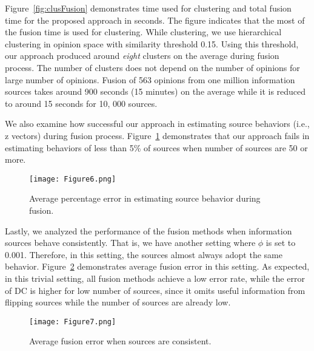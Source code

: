 \documentclass[a4,12pt]{ozu-thesis}
\begin{document}
Figure~\ref{fig:clusFusion} demonstrates time used for clustering and total fusion time for the proposed approach in seconds. The figure indicates that the most of the fusion time is used for clustering. While clustering, we use hierarchical clustering in opinion space with similarity threshold 0.15. Using this threshold, our approach produced around \textit{eight} clusters on the average during fusion process. The number of clusters does not depend on the number of opinions for large number of opinions. Fusion of 563 opinions from one million information sources takes around 900 seconds (15 minutes) on the average while it is reduced to around 15 seconds for 10, 000 sources.

We also examine how successful our approach in estimating source behaviors (i.e., z vectors) during fusion process.
Figure~\ref{fig:avegErrDuringFusion} demonstrates that our approach fails in estimating behaviors of less than 5\% of sources when number of sources are 50 or more.

\begin{figure}[h]
\begin{center}
\texttt{[image: Figure6.png]}
\end{center}
\caption{Average percentage error in estimating source behavior during fusion.}
\label{fig:avegErrDuringFusion}
\end{figure}

Lastly, we analyzed the performance of the fusion methods when information sources behave consistently. That is, we have another setting where $\phi$ is set to 0.001. Therefore, in this setting, the sources almost always adopt the same behavior. Figure~\ref{fig:avegErrConsistent} demonstrates average fusion error in this setting. As expected, in this trivial setting, all fusion methods achieve a low error rate, while the error of DC is higher for low number of sources, since it omits useful information from flipping sources while the number of sources are already low.

\begin{figure}[h]
\begin{center}
\texttt{[image: Figure7.png]}
\end{center}
\caption{Average fusion error when sources are consistent.}
\label{fig:avegErrConsistent}
\end{figure}

\end{document}
